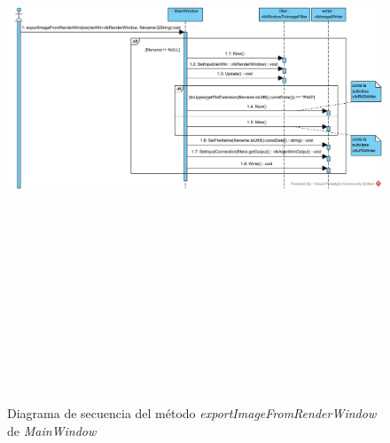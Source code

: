 \begin{figure}[H]
	\centering
	\includegraphics[angle=90,height=18cm]{imagenes/diagramas/secuencia/MainWindow_ExportImageFromRenderWindow}
	\caption{Diagrama de secuencia del método \textit{exportImageFromRenderWindow} de \textit{MainWindow}}
	\label{fig:diagrama_secuencia_mainwindow_exportimagefromrenderwindow}
\end{figure}

